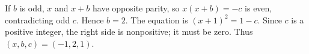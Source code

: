 If $b$ is odd, $x$ and $x+b$ have opposite parity, so $x(x+b)=-c$ is even, contradicting odd $c$. Hence $b=2$. The equation is $(x+1)^2=1-c$. Since $c$ is a positive integer, the right side is nonpositive; it must be zero. Thus $\boxed{(x,b,c)=(-1,2,1)}$.

